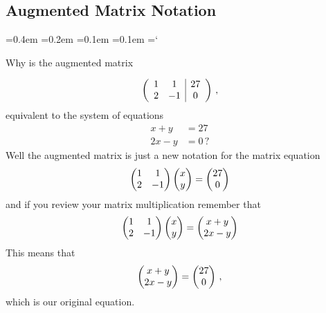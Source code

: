 \subsection*{Augmented Matrix Notation}

{\ttfamily
{}\font=0.4em
\font=0.2em
\font=0.1em
\font=0.1em
\hyphenchar\font=`\-


\hypertarget{script_gaussian_elimination_more}{Why is the augmented  matrix} 
\[ \left( \begin{array}{cc | c}
1 & 1 & 27 \\
2 & -1 & 0  
\end{array} \right)\, ,
\]
equivalent to the system of equations
\begin{align*}
 x+y &= 27\\
 2x - y &= 0\, ?
\end{align*}
Well the augmented matrix is just a new notation for the matrix equation
\begin{equation*}
    \begin{pmatrix}
      1             &1  \\
      2             &-1
    \end{pmatrix}
  \begin{pmatrix} x \\ y \end{pmatrix}
  =
  \begin{pmatrix} 27 \\ 0 \end{pmatrix}
\end{equation*}
and if you review your matrix multiplication remember that 
\begin{equation*}
    \begin{pmatrix}
      1             &1  \\
      2             &-1
    \end{pmatrix}
  \begin{pmatrix} x \\ y \end{pmatrix}
  =
  \begin{pmatrix} x+ y \\ 2x - y \end{pmatrix}
\end{equation*}
This means that
\begin{equation*}
  \begin{pmatrix} x+ y \\ 2x - y \end{pmatrix}
  =
  \begin{pmatrix} 27 \\ 0 \end{pmatrix}\, ,
\end{equation*}
which is our original equation.

}

